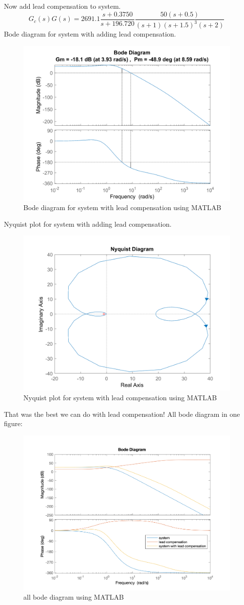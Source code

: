 Now add lead compensation to system.
$$
G_c(s)G(s) = 2691.1\dfrac{s + 0.3750}{s + 196.720} \dfrac{50(s+0.5)}{(s+1)(s+1.5)^{3}(s+2)}
$$
Bode diagram for system with adding lead compensation.
\begin{figure}[H]
	\caption{Bode diagram for system with lead compensation using MATLAB}
	\centering
	\includegraphics[width=12cm]{../Figure/Q1/a/new_margin.png}
\end{figure}
Nyquist plot for system with adding lead compensation.
\begin{figure}[H]
	\caption{Nyquist plot for system with lead compensation using MATLAB}
	\centering
	\includegraphics[width=12cm]{../Figure/Q1/a/new_nyquist.png}
\end{figure}
That was the best we can do with lead compensation!
All bode diagram in one figure:
\begin{figure}[H]
	\caption{all bode diagram using MATLAB}
	\centering
	\includegraphics[width=12cm]{../Figure/Q1/a/all_in_one.png}
\end{figure}